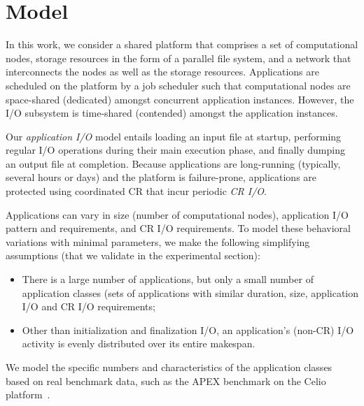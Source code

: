\section{Model}
\label{sec:model}


In this work, we consider a shared platform that comprises a set of computational
nodes, storage resources in the form of a parallel file system, and a network that
interconnects the nodes as well as the storage resources. Applications are scheduled
on the platform by a job scheduler such that computational nodes are space-shared
(dedicated) amongst concurrent application instances. However, the I/O subsystem is
time-shared (contended) amongst the application instances.

Our \emph{application I/O} model entails loading an input file at startup, performing
regular I/O operations during their main execution phase, and finally dumping an
output file at completion. Because applications are long-running (typically, several
hours or days) and the platform is failure-prone, applications are protected using
coordinated CR that incur periodic \emph{CR I/O}.


Applications can vary in size (number of computational nodes), application I/O
pattern and requirements, and CR I/O requirements. To model these behavioral
variations with minimal parameters, we make the following simplifying assumptions
(that we validate in the experimental section):
\begin{itemize}
  \item There is a large number of applications, but only a small number of
    application classes (sets of applications with similar duration, size,
    application I/O and CR I/O requirements;
  \item Other than initialization and finalization I/O, an application's (non-CR) I/O
    activity is evenly distributed over its entire makespan.
\end{itemize}
We model the specific numbers and characteristics of the application classes based on
real benchmark data, such as the APEX benchmark on the Celio platform~\cite{xx}.
 
